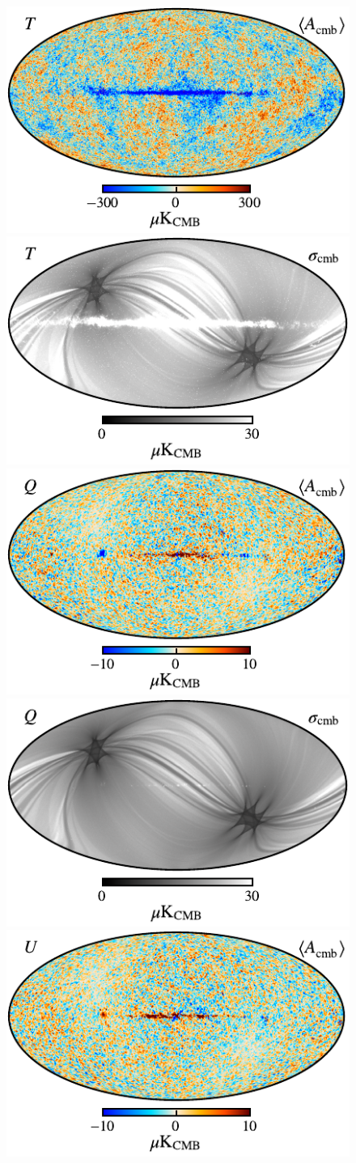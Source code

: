 \documentclass[twocolumn]{aa}
\begin{document}
\begin{figure}[t]
  \center
  \includegraphics[width=0.49\linewidth]{figs/BP_cmb_v2_I_MEAN_w8_n1024_cb_nodip_c-planck.pdf}
  \includegraphics[width=0.49\linewidth]{figs/BP_cmb_v2_I_STDDEV_w8_n1024_cb_c-neutral.pdf}\\  
  \includegraphics[width=0.49\linewidth]{figs/BP_cmb_v2_Q_MEAN_w8_n1024_58arcmin_cb_c-planck.pdf}
  \includegraphics[width=0.49\linewidth]{figs/BP_cmb_v2_Q_STDDEV_w8_n1024_cb_c-neutral.pdf}\\  
  \includegraphics[width=0.49\linewidth]{figs/BP_cmb_v2_U_MEAN_w8_n1024_58arcmin_cb_c-planck.pdf}

\end{figure}
\end{document}

